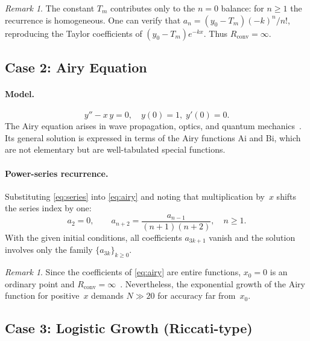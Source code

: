 \documentclass[12pt,a4paper]{article}
\theoremstyle{definition}
\theoremstyle{remark}
\newtheorem{remark}[theorem]{Remark}
\newcommand{\Rconv}{R_{\mathrm{conv}}}
\begin{document}
\begin{remark}
  The constant $T_m$ contributes only to the $n = 0$ balance: for
  $n \geq 1$ the recurrence is homogeneous.  One can verify that
  $a_n = (y_0 - T_m)(-k)^n / n!$, reproducing the Taylor coefficients
  of $(y_0 - T_m)e^{-kx}$.  Thus $\Rconv = \infty$.
\end{remark}

\subsection{Case 2: Airy Equation}
\label{sec:airy}

\paragraph{Model.}
\begin{equation}
  y'' - x\,y = 0, \quad y(0) = 1,\; y'(0) = 0.
  \label{eq:airy}
\end{equation}
The Airy equation arises in wave propagation, optics, and quantum
mechanics~\cite{boyce2017}.  Its general solution is expressed in
terms of the Airy functions Ai and Bi, which are not elementary but
are well-tabulated special functions.

\paragraph{Power-series recurrence.}
Substituting \eqref{eq:series} into \eqref{eq:airy} and noting that
multiplication by~$x$ shifts the series index by one:
\begin{equation}
  a_2 = 0, \qquad
  a_{n+2} = \frac{a_{n-1}}{(n+1)(n+2)}, \quad n \geq 1.
  \label{eq:airy_rec}
\end{equation}
With the given initial conditions, all coefficients $a_{3k+1}$ vanish
and the solution involves only the family $\{a_{3k}\}_{k \geq 0}$.

\begin{remark}
  Since the coefficients of \eqref{eq:airy} are entire functions,
  $x_0 = 0$ is an ordinary point and $\Rconv = \infty$~\cite{coddington1955}.
  Nevertheless, the exponential growth of the Airy function for
  positive~$x$ demands $N \gg 20$ for accuracy far from~$x_0$.
\end{remark}

\subsection{Case 3: Logistic Growth (Riccati-type)}
\label{sec:logistic}
\end{document}
